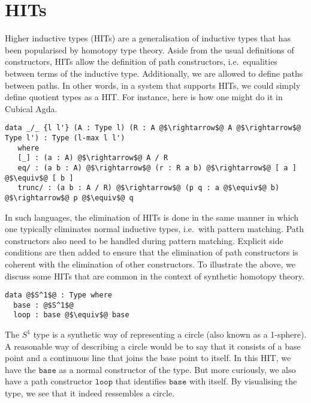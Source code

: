 \documentclass[12pt,twoside,maitrise]{dms}
\theoremstyle{definition}
\numberwithin{equation}{section}
\numberwithin{table}{chapter}
\numberwithin{figure}{chapter}
\newcommand\id[1] {\texttt{#1}}
\begin{document}
\section{HITs}
Higher inductive types (HITs) are a generalisation of inductive types that has
been popularised by homotopy type theory\cite{HoTTbook}. Aside from the usual
definitions of constructors, HITs allow the definition of path constructors,
i.e.\ equalities between terms of the inductive type. Additionally, we are
allowed to define paths between paths. In other words, in a system that supports
HITs, we could simply define quotient types as a HIT. For instance, here is how
one might do it in Cubical Agda.

\begin{verbatim}
data _/_ {l l'} (A : Type l) (R : A @$\rightarrow$@ A @$\rightarrow$@ Type l') : Type (l-max l l')
   where
   [_] : (a : A) @$\rightarrow$@ A / R
   eq/ : (a b : A) @$\rightarrow$@ (r : R a b) @$\rightarrow$@ [ a ] @$\equiv$@ [ b ]
   trunc/ : (a b : A / R) @$\rightarrow$@ (p q : a @$\equiv$@ b) @$\rightarrow$@ p @$\equiv$@ q
\end{verbatim}

In such languages, the elimination of HITs is done in the same manner in which
one typically eliminates normal inductive types, i.e.\ with pattern matching.
Path constructors also need to be handled during pattern matching. Explicit side
conditions are then added to ensure that the elimination of path constructors is
coherent with the elimination of other constructors. To illustrate the above, we
discuss some HITs that are common in the context of synthetic homotopy theory.

\begin{verbatim}
data @$S^1$@ : Type where
  base : @$S^1$@
  loop : base @$\equiv$@ base
\end{verbatim}

The $S^1$ type is a synthetic way of representing a circle (also known as a
1-sphere). A reasonable way of describing a circle would be to say that it
consists of a base point and a continuous line that joins the base point to
itself. In this HIT, we have the $\id{base}$ as a normal constructor of the
type. But more curiously, we also have a path constructor $\id{loop}$ that
identifies $\id{base}$ with itself. By visualising the type, we see that it
indeed ressembles a circle.
\end{document}
